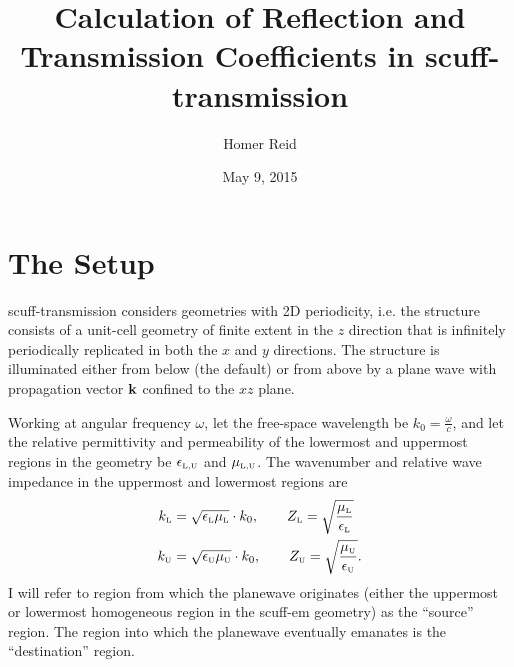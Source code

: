 \documentclass[letterpaper]{article}
\title {Calculation of Reflection and Transmission Coefficients
        in {\sc scuff-transmission}}
\author {Homer Reid}
\date {May 9, 2015}
\begin{document}
\pagestyle{myheadings}
\maketitle

\tableofcontents

\newpage
\section{The Setup}

{\sc scuff-transmission} considers geometries with 2D periodicity,
i.e. the structure consists of a unit-cell geometry of finite
extent in the $z$ direction that is infinitely periodically 
replicated in both the $x$ and $y$ directions. The structure is 
illuminated either from below (the default) or from above 
by a plane wave with propagation vector $\mathbf{k}$ confined to the 
$xz$ plane. 

Working at angular frequency $\omega$, let the free-space
wavelength be $k_0=\frac{\omega}{c}$, and let the relative 
permittivity and permeability of the lowermost and uppermost 
regions in the geometry be $\epsilon_{\hbox{\tiny{L,U}}}$ and $\mu_{\hbox{\tiny{L,U}}}$.
The wavenumber and relative wave impedance in the 
uppermost and lowermost regions are
\begin{align*}
  k_{\hbox{\tiny{L}}}&=\sqrt{\epsilon_{\hbox{\tiny{L}}} \mu_{\hbox{\tiny{L}}}} \cdot k_0,
   \qquad   
  Z_{\hbox{\tiny{L}}}=\sqrt\frac{\mu_{\hbox{\tiny{L}}}}{\epsilon_{\hbox{\tiny{L}}}}
\\
  k_{\hbox{\tiny{U}}}&=\sqrt{\epsilon_{\hbox{\tiny{U}}} \mu_{\hbox{\tiny{U}}}} \cdot k_0,
   \qquad   
  Z_{\hbox{\tiny{U}}}=\sqrt\frac{\mu_{\hbox{\tiny{U}}}}{\epsilon_{\hbox{\tiny{U}}}}.
\end{align*}
I will refer to region from which the planewave 
originates (either the uppermost or lowermost homogeneous
region in the {\sc scuff-em} geometry) as the ``source'' region.
The region into which the planewave eventually emanates 
is the ``destination'' region.
\end{document}
